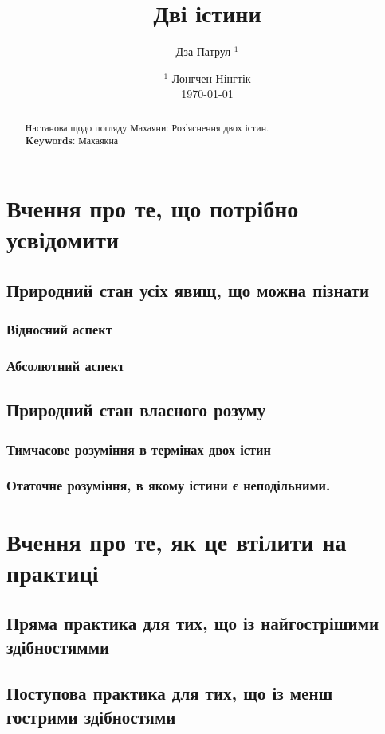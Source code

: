 \documentclass{article}
\begin{document}
\title{Дві істини}
\author{Дза Патрул $^1$}
\date{ $^1$ Лонгчен Нінгтік \\ \today }

\maketitle

\begin{abstract}Настанова щодо погляду Махаяни: Роз’яснення двох істин. \\
\textbf{Keywords}: Махаякна
\end{abstract}

\ifincludeTOC
  \tableofcontents
\fi

\newpage

\section{Вчення про те, що потрібно усвідомити}

\subsection{Природний стан усіх явищ, що можна пізнати}

\subsubsection{Відносний аспект}

\subsubsection{Абсолютний аспект}

\subsection{Природний стан власного розуму}

\subsubsection{Тимчасове розуміння в термінах двох істин}

\subsubsection{Отаточне розуміння, в якому істини є неподільними.}

\section{Вчення про те, як це втілити на практиці}

\subsection{Пряма практика для тих, що із найгострішими здібностямми}

\subsection{Поступова практика для тих, що із менш гострими здібностями}
\end{document}
